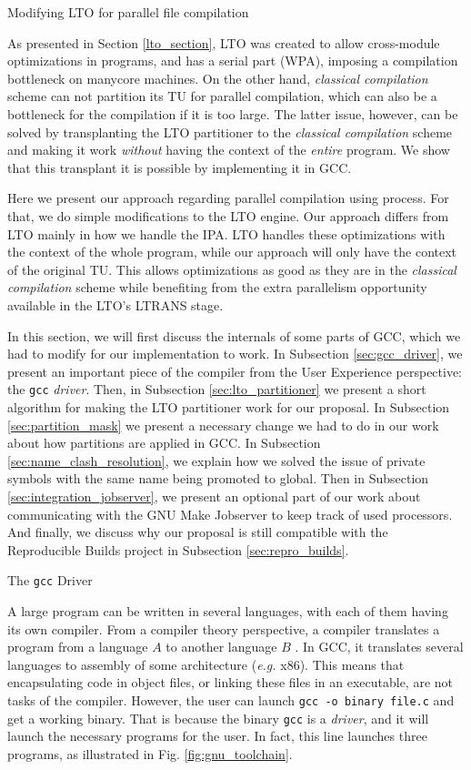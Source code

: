 \begin{section}{Modifying LTO for parallel file compilation}

As presented in Section \ref{lto_section}, LTO was created to allow
cross-module optimizations in programs, and has a serial part (WPA), imposing a
compilation bottleneck on manycore machines. On the other hand, \emph{classical
compilation} scheme can not partition its TU for parallel compilation, which
can also be a bottleneck for the compilation if it is too large.  The latter
issue, however, can be solved by transplanting the LTO partitioner to the
\emph{classical compilation} scheme and making it work \textit{without} having
the context of the \textit{entire} program. We show that this transplant it is
possible by implementing it in GCC.

Here we present our approach regarding parallel compilation using process. For
that, we do simple modifications to the LTO engine.  Our approach differs from
LTO mainly in how we handle the IPA.  LTO handles these optimizations with the
context of the whole program, while our approach will only have the context of
the original TU.  This allows optimizations as good as they are in the
\emph{classical compilation} scheme while benefiting from the extra parallelism
opportunity available in the LTO's LTRANS stage.

In this section, we will first discuss the internals of some parts of GCC,
which we had to modify for our implementation to work. In Subsection
\ref{sec:gcc_driver}, we present an important piece of the compiler from the
User Experience perspective: the \texttt{gcc} \textit{driver}. Then, in
Subsection \ref{sec:lto_partitioner} we present a short algorithm for making
the LTO partitioner work for our proposal. In Subsection
\ref{sec:partition_mask} we present a necessary change we had to do in our work
about how partitions are applied in GCC. In
Subsection \ref{sec:name_clash_resolution}, we explain how we solved the issue
of private symbols with the same name being promoted to global.
Then in Subsection \ref{sec:integration_jobserver}, we present an optional part
of our work about communicating with the GNU Make Jobserver to keep track of
used processors. And finally, we discuss why our proposal is still compatible
with the Reproducible Builds project in Subsection \ref{sec:repro_builds}.

\begin{subsection}{The \texttt{gcc} Driver}\label{sec:gcc_driver}

A large program can be written in several languages, with each of them having
its own compiler. From a compiler theory perspective, a compiler
translates a program from a language $A$ to another language $B$
\cite{dragonbook}. In GCC, it translates several languages to assembly
of some architecture (\textit{e.g.} x86). This means that
encapsulating code in object files, or linking these files in an executable, are
not tasks of the compiler. However, the user can launch \texttt{gcc -o binary
file.c} and get a working binary. That is because the binary \texttt{gcc} is
a \textit{driver}, and it will launch the
necessary programs for the user. In fact, this line launches three programs,
as illustrated in Fig. \ref{fig:gnu_toolchain}.


\end{subsection}
\end{section}
